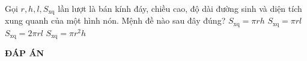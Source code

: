 \begin{ex}%
Gọi $r,h,l,S_{\text{xq}}$ lần lượt là bán kính đáy, chiều cao, độ dài đường sinh và diện tích xung quanh của một hình nón. Mệnh đề nào sau đây đúng?
\choice
{$S_{\text{xq}}=\pi r h$}
{\True $S_{\text{xq}}=\pi r l$}
{$S_{\text{xq}}=2\pi r l$}
{$S_{\text{xq}}=\pi r^2 h$}
\end{ex}

\newpage
\begin{center}
	\textbf{ĐÁP ÁN}
\end{center}
\begin{multicols}{10}
	 
\end{multicols}